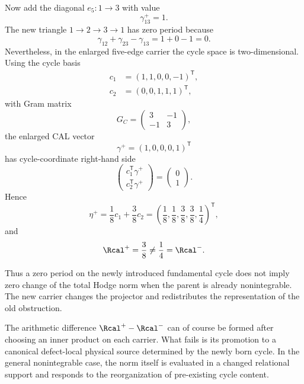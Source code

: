 Now add the diagonal $e_5:1\to3$ with value
\begin{equation}
\gamma^+_{13}=1.
\end{equation}
The new triangle $1\to2\to3\to1$ has zero period because
\begin{equation}
\gamma_{12}+\gamma_{23}-\gamma_{13}
=1+0-1=0.
\label{eq:zero-new-period}
\end{equation}
Nevertheless, in the enlarged five-edge carrier the cycle space is two-dimensional. Using the cycle basis
\begin{align}
c_1&=(1,1,0,0,-1)^{\mathsf T},\\
c_2&=(0,0,1,1,1)^{\mathsf T},
\end{align}
with Gram matrix
\begin{equation}
G_C=
\begin{pmatrix}
3&-1\\
-1&3
\end{pmatrix},
\end{equation}
the enlarged CAL vector
\begin{equation}
\gamma^+=(1,0,0,0,1)^{\mathsf T}
\end{equation}
has cycle-coordinate right-hand side
\begin{equation}
\begin{pmatrix}
c_1^{\mathsf T}\gamma^+\\
c_2^{\mathsf T}\gamma^+
\end{pmatrix}
=
\begin{pmatrix}
0\\1
\end{pmatrix}.
\end{equation}
Hence
\begin{equation}
\eta^+
=\frac18c_1+\frac38c_2
=
\left(
\frac18,\frac18,\frac38,\frac38,\frac14
\right)^{\mathsf T},
\end{equation}
and
\begin{equation}
\Rcal^+=\frac38
\neq
\frac14=\Rcal^-.
\label{eq:zero-defect-R-change}
\end{equation}

Thus a zero period on the newly introduced fundamental cycle does not imply zero change of the total Hodge norm when the parent is already nonintegrable. The new carrier changes the projector and redistributes the representation of the old obstruction.

The arithmetic difference $\Rcal^+-\Rcal^-$ can of course be formed after choosing an inner product on each carrier. What fails is its promotion to a canonical defect-local physical source determined by the newly born cycle. In the general nonintegrable case, the norm itself is evaluated in a changed relational support and responds to the reorganization of pre-existing cycle content.

